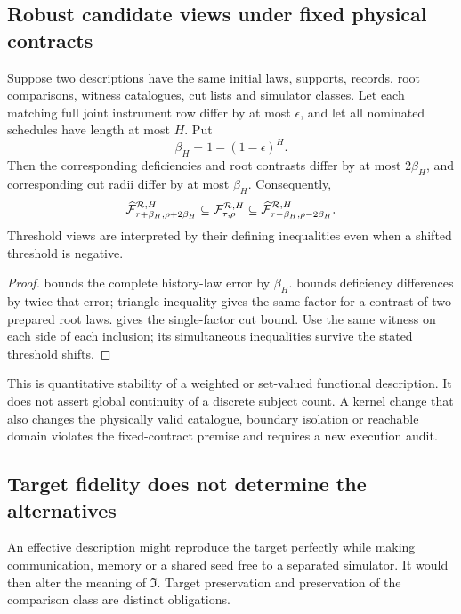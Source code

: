 \subsection{Robust candidate views under fixed physical contracts}
\begin{corollary}\label{p2-15}
Suppose two descriptions have the same initial laws, supports, records, root comparisons, witness catalogues, cut lists and simulator classes. Let each matching full joint instrument row differ by at most \(\epsilon\), and let all nominated schedules have length at most \(H\). Put
\begin{equation}\label{eq:beta-H}
 \beta_H=1-(1-\epsilon)^H.
\end{equation}
Then the corresponding deficiencies and root contrasts differ by at most \(2\beta_H\), and corresponding cut radii differ by at most \(\beta_H\). Consequently,
\begin{equation}\label{eq:fixed-family-inclusion}
 \widehat{\mathcal F}_{\tau+\beta_H,\rho+2\beta_H}^{\mathcal R,H}
 \subseteq\mathcal F_{\tau,\rho}^{\mathcal R,H}
 \subseteq
 \widehat{\mathcal F}_{\tau-\beta_H,\rho-2\beta_H}^{\mathcal R,H}.
\end{equation}
Threshold views are interpreted by their defining inequalities even when a shifted threshold is negative.
\end{corollary}
\begin{proof}
 bounds the complete history-law error by \(\beta_H\).  bounds deficiency differences by twice that error; triangle inequality gives the same factor for a contrast of two prepared root laws.  gives the single-factor cut bound. Use the same witness on each side of each inclusion; its simultaneous inequalities survive the stated threshold shifts.
\end{proof}
This is quantitative stability of a weighted or set-valued functional description. It does not assert global continuity of a discrete subject count. A kernel change that also changes the physically valid catalogue, boundary isolation or reachable domain violates the fixed-contract premise and requires a new execution audit.

\subsection{Target fidelity does not determine the alternatives}
An effective description might reproduce the target perfectly while making communication, memory or a shared seed free to a separated simulator. It would then alter the meaning of \(\mathfrak I\). Target preservation and preservation of the comparison class are distinct obligations.

